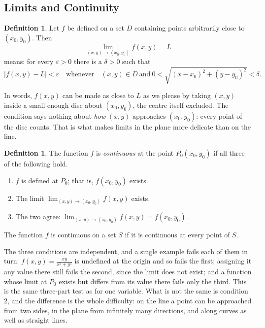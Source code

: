 \documentclass[11pt,a4paper]{article}
\theoremstyle{definition}
\newtheorem{defn}[thm]{Definition}
\begin{document}
{\color[wave]{485}\subsection{Limits and Continuity}}

\begin{defn}
\label{defn:limit}
Let $f$ be defined on a set $D$ containing points arbitrarily close to
$(x_0,y_0)$. Then
\[\lim_{(x,y) \to (x_0,y_0)}f(x,y) = L\]
means: for every $\varepsilon>0$ there is a $\delta>0$ such that
\[|f(x,y) - L| < \varepsilon\quad\text{whenever}\quad (x,y)\in D\ \text{and}\
0 < \sqrt{(x-x_0)^2 + (y-y_0)^2} <\delta .\]
\end{defn}

In words, $f(x,y)$ can be made as close to $L$ as we please by taking $(x,y)$
inside a small enough disc about $(x_0,y_0)$, the centre itself excluded. The
condition says nothing about \emph{how} $(x,y)$ approaches $(x_0,y_0)$: every
point of the disc counts. That is what makes limits in the plane more delicate
than on the line.

\begin{defn}
\label{defn:continuous}
The function $f$ is \emph{continuous} at the point $P_0(x_0,y_0)$ if all three
of the following hold.
\begin{enumerate}
\item $f$ is defined at $P_0$; that is, $f(x_0,y_0)$ exists.

\item The limit
$\lim_{(x,y)\to (x_0,y_0)} f(x,y)$ exists.

\item The two agree:
$\lim_{(x,y)\to (x_0,y_0)} f(x,y) = f(x_0,y_0)$.
\end{enumerate}
The function $f$ is continuous on a set $S$ if it is continuous at every point
of $S$.
\end{defn}

The three conditions are independent, and a single example fails each of them in
turn: $f(x,y) = \frac{xy}{x^2+y^2}$ is undefined at the origin and so fails the
first; assigning it any value there still fails the second, since the limit does
not exist; and a function whose limit at $P_0$ exists but differs from its value
there fails only the third. This is the same three-part test as for one
variable. What is not the same is condition 2, and the difference is the whole
difficulty: on the line a point can be approached from two sides, in the plane
from infinitely many directions, and along curves as well as straight lines.
\end{document}

